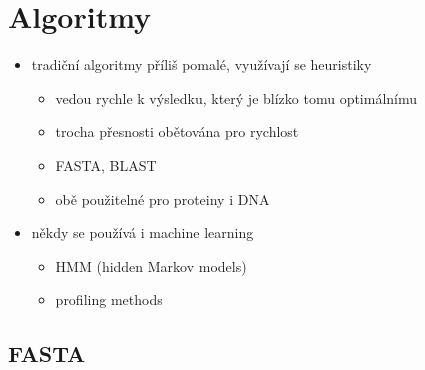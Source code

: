 \documentclass[DIV=8]{scrreprt}
\begin{document}
\section{Algoritmy} \label{Algoritmy}


\begin{itemize}[nosep]
    \item tradiční algoritmy příliš pomalé, využívají se heuristiky
\begin{itemize}[nosep]
    \item vedou rychle k výsledku, který je blízko tomu optimálnímu
    \item trocha přesnosti obětována pro rychlost
    \item FASTA, BLAST
    \item obě použitelné pro proteiny i DNA
\end{itemize}

    \item někdy se používá i machine learning
\begin{itemize}[nosep]
    \item HMM (hidden Markov models)
    \item profiling methods
\end{itemize}

\end{itemize}



\subsection{FASTA} \label{FASTA}
\end{document}
